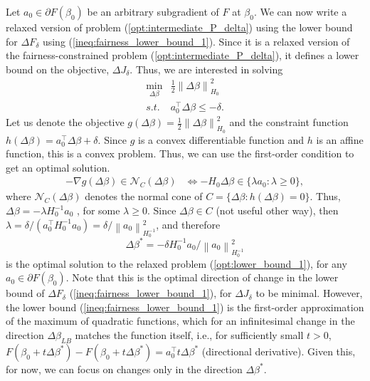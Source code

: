 \documentclass[11pt]{article}
\theoremstyle{plain}
\theoremstyle{definition}
\newcommand{\norm}[1]{\left\lVert #1 \right\rVert}
\newcommand{\1}{\mathbf{1}}
\newcommand{\N}{\mathcal{N}}
\renewcommand{\t}{^{\top}}
\begin{document}
    Let $a_0\in \partial F(\beta_0)$ be an arbitrary subgradient of $F$ at $\beta_0$. We can now write a relaxed version of problem (\ref{opt:intermediate_P_delta}) using the lower bound for $\Delta F_\delta$ using (\ref{ineq:fairness_lower_bound_1}). Since it is a relaxed version of the fairness-constrained problem (\ref{opt:intermediate_P_delta}), it defines a lower bound on the objective, $\Delta J_\delta$. Thus, we are interested in solving 
\begin{equation}
\label{opt:lower_bound_1}
    \begin{array}{cc}
      \displaystyle  \min_{\Delta \beta} & \frac{1}{2}\norm{\Delta \beta}^2_{H_0} \\
        s.t. & a_0\t\Delta \beta \leq -\delta. %
    \end{array}
\end{equation}
Let us denote the objective $g(\Delta \beta)= \frac{1}{2}\norm{\Delta \beta}^2_{H_0}$ and the constraint function $h(\Delta \beta)=a_0\t\Delta \beta +\delta$. Since $g$ is a convex differentiable function and $h$ is an affine function, this is a convex problem. Thus, we can use the first-order condition to get an optimal solution.
\begin{align*}
    -\nabla g(\Delta \beta) \in \N_C(\Delta \beta) &\iff -H_0 \Delta \beta \in \{\lambda a_0 : \lambda \geq 0\},    
\end{align*}
where $\N_C(\Delta \beta)$ denotes the normal cone of $C=\{\Delta \beta : h(\Delta \beta)= 0\}$. Thus, $\Delta \beta = -\lambda H_0^{-1} a_0 $ , for some $\lambda \geq 0$. Since $\Delta \beta\in C$ (not useful other way), then $\lambda = {\delta}/{(a_0\t H_0^{-1} a_0) }=\delta/\norm{a_0}_{H_0^{-1}}^2$, and therefore \begin{equation}
\label{eq:beta_lb}
    \boxed{\Delta \beta^* ={-\delta H_0^{-1} a_0} / \norm{a_0}_{H_0^{-1}}^2}
\end{equation} is the optimal solution to the relaxed problem (\ref{opt:lower_bound_1}), for any $a_0 \in \partial F(\beta_0)$. Note that this is the optimal direction of change in the lower bound of $\Delta F_\delta$ (\ref{ineq:fairness_lower_bound_1}), for $\Delta J_\delta$ to be minimal. However, the lower bound (\ref{ineq:fairness_lower_bound_1}) is the first-order approximation of the maximum of quadratic functions, which for an infinitesimal change in the direction $\Delta\beta_{LB}$ matches the function itself, i.e., for sufficiently small $t >0$, $F(\beta_0 + t\Delta \beta^* ) - F(\beta_0 + t\Delta \beta^* ) = a_0\t t\Delta \beta^*$ (directional derivative). Given this, for now, we can focus on changes only in the direction $\Delta \beta ^*$.
\end{document}
